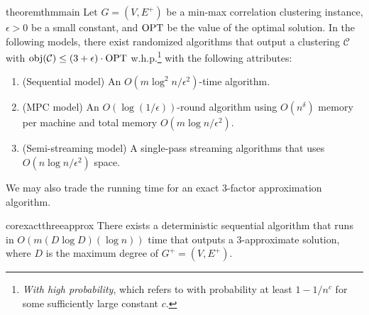 \begin{restatable}{theorem}{thmmain} \label{thm:thmmain}
Let $G = (V, E^+)$ be a min-max correlation clustering instance, $\epsilon > 0$ be a small constant, and $\mathrm{OPT}$ be the value of the optimal solution. In the following models, there exist randomized algorithms that output a clustering $\mathcal{C}$ with $\mathrm{obj}(\mathcal{C}) \leq (3+\epsilon)\cdot \mathrm{OPT}$ w.h.p.\footnote{{\it With high probability}, which refers to with probability at least $1-1/n^{c}$ for some sufficiently large constant $c$.} with the following attributes:
\begin{enumerate}
    \item \label{itm:main1} (Sequential model) An $O(m \log^2 n/ \epsilon^2 )$-time algorithm.
    
    
    \item \label{itm:main2}(MPC model) An $O(\log(1/\epsilon))$-round algorithm using $O(n^{\delta})$ memory per machine and total memory $O(m \log n / \epsilon^2)$.
    
    \item \label{itm:main3}(Semi-streaming model) A single-pass streaming algorithms that uses $O(n \log n/ \epsilon^2)$ space.
\end{enumerate}
\end{restatable}

We may also trade the running time for an exact 3-factor approximation algorithm. 
\begin{restatable}{cor}{exactthreeapprox}\label{cor:exact3approx}
There exists a deterministic sequential algorithm that runs in $O(m (D\log D) (\log n))$ time that outputs a 3-approximate solution, where $D$ is the maximum degree of $G^{+} = (V, E^{+})$. 
\end{restatable}


